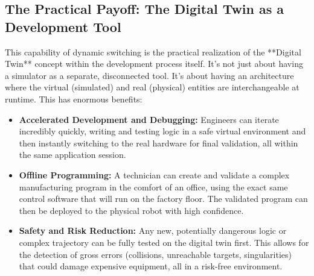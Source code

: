 \subsection{The Practical Payoff: The Digital Twin as a Development Tool}
\label{subsec:digital_twin_payoff}

This capability of dynamic switching is the practical realization of the **Digital Twin** concept within the development process itself. It's not just about having a simulator as a separate, disconnected tool. It's about having an architecture where the virtual (simulated) and real (physical) entities are interchangeable at runtime. This has enormous benefits:
\begin{itemize}
    \item \textbf{Accelerated Development and Debugging:} Engineers can iterate incredibly quickly, writing and testing logic in a safe virtual environment and then instantly switching to the real hardware for final validation, all within the same application session.
    \item \textbf{Offline Programming:} A technician can create and validate a complex manufacturing program in the comfort of an office, using the exact same control software that will run on the factory floor. The validated program can then be deployed to the physical robot with high confidence.
    \item \textbf{Safety and Risk Reduction:} Any new, potentially dangerous logic or complex trajectory can be fully tested on the digital twin first. This allows for the detection of gross errors (collisions, unreachable targets, singularities) that could damage expensive equipment, all in a risk-free environment.
\end{itemize}


